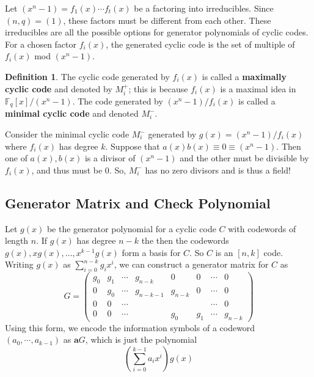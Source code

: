 \documentclass{article}
\newcommand{\F}{\mathbb{F}}
\renewcommand{\=}{\equiv}
\newcommand{\ass}[1]{\left( #1 \right)}
\renewcommand{\v}{\mathbf}
\theoremstyle{plain}
\theoremstyle{definition}
\newtheorem{defn}{Definition}[subsection]
\begin{document}
Let $(x^n - 1) = f_1(x) \cdots f_t(x)$ be a factoring into irreducibles.
Since $(n, q) = (1)$, these factors must be different from each other.
These irreducibles are all the possible options for generator polynomials of cyclic codes.
For a chosen factor $f_i(x)$, the generated cyclic code is the set of multiple of $f_i(x)$ mod $(x^n - 1)$.

\begin{defn}
  \label{def:cyclic-generator}
  The cyclic code generated by $f_i(x)$ is called a \textbf{maximally cyclic code} and denoted by $M_i^+$; this is because $f_i(x)$ is a maximal idea in $\F_q[x]/(x^n-1)$.
  The code generated by $(x^n-1)/f_i(x)$ is called a \textbf{minimal cyclic code} and denoted $M_i^-$.
\end{defn}

Consider the minimal cyclic code $M_i^-$ generated by $g(x) = (x^n-1)/f_i(x)$ where $f_i(x)$ has degree $k$.
Suppose that $a(x) b(x) \= 0 \= (x^n-1)$.
Then one of $a(x), b(x)$ is a divisor of $(x^n-1)$ and the other must be divisible by $f_i(x)$, and thus must be $0$.
So, $M_i^-$ has no zero divisors and is thus a field!

\subsection{Generator Matrix and Check Polynomial}
\label{sec:gen-mat-and-check-poly}

Let $g(x)$ be the generator polynomial for a cyclic code $C$ with codewords of length $n$.
If $g(x)$ has degree $n-k$ the then the codewords $g(x), xg(x), \dots, x^{k-1}g(x)$ form a basis for $C$.
So $C$ is an $[n,k]$ code.
Writing $g(x)$ as $\sum_{i=0}^{n-k} g_i x^i$, we can construct a generator matrix for $C$ as
$$ G = \begin{pmatrix}
  g_0 & g_1 & \cdots & g_{n-k}   & 0       & 0   & \cdots & 0 \\
  0   & g_0 & \cdots & g_{n-k-1} & g_{n-k} & 0   & \cdots & 0 \\
  0   & 0   & \cdots &           &         &     & \cdots & 0 \\
  0   & 0   & \cdots &           & g_0     & g_1 & \cdots & g_{n-k}
\end{pmatrix} $$
Using this form, we encode the information symbols of a codeword $(a_0, \cdots, a_{k-1})$ as $\v a G$, which is just the polynomial
$$ \ass{ \sum_{i=0}^{k-1} a_i x^i } g(x) $$
\end{document}
